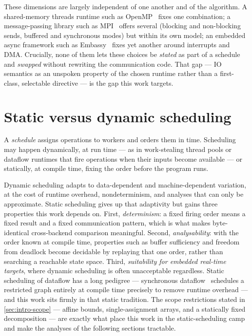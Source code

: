 These dimensions are largely independent of one another and of the algorithm. A
shared-memory threads runtime such as OpenMP~\cite{dagum1998openmp} fixes one
combination; a message-passing library such as MPI~\cite{mpiforum2021} offers
several (blocking and non-blocking sends, buffered and synchronous modes) but
within its own model; an embedded async framework such as
Embassy~\cite{embassy} fixes yet another around interrupts and DMA. Crucially,
none of them lets these choices be \emph{stated} as part of a schedule and
\emph{swapped} without rewriting the communication code. That gap --- IO
semantics as an unspoken property of the chosen runtime rather than a
first-class, selectable directive --- is the gap this work targets.

\section{Static versus dynamic scheduling}\label{sec:bg-scheduling}

A \emph{schedule} assigns operations to workers and orders them in time.
Scheduling may happen dynamically, at run time --- as in work-stealing thread
pools or dataflow runtimes that fire operations when their inputs become
available --- or statically, at compile time, fixing the order before the
program runs.

Dynamic scheduling adapts to data-dependent and machine-dependent variation, at
the cost of runtime overhead, nondeterminism, and analyses that can only be
approximate. Static scheduling gives up that adaptivity but gains three
properties this work depends on. First, \emph{determinism}: a fixed firing order
means a fixed result and a fixed communication pattern, which is what makes
byte-identical cross-backend comparison meaningful. Second,
\emph{analysability}: with the order known at compile time, properties such as
buffer sufficiency and freedom from deadlock become decidable by replaying that
one order, rather than searching a reachable state space. Third, \emph{suitability
for embedded real-time targets}, where dynamic scheduling is often unacceptable
regardless. Static scheduling of dataflow has a long pedigree --- synchronous
dataflow~\cite{lee1987sdf} schedules a restricted graph entirely at compile time
precisely to remove runtime overhead --- and this work sits firmly in that
static tradition. The scope restrictions stated in \cref{sec:intro-scope} ---
affine bounds, single-assignment arrays, and a statically fixed decomposition ---
are exactly what place this work in the static-scheduling camp and make the
analyses of the following sections tractable.

